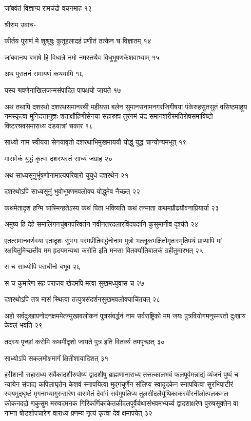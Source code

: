 जांबवंतं विज्ञाप्य रामचंद्रो वचनमाह १३

श्रीराम उवाच-

कीर्तय पुराणं मे शुश्रूषुः कुतूहलादहं प्रणीतं तत्केन च विज्ञातम् १४

जांबवानथ बभाषे हि विधात्रे नमो नमस्तथैव विधुभूषणकेशवाभ्याम् १५

अथ पुरातनं रामायणं कथयामि १६

यस्य श्रवणेनाखिलजन्मसंपादित पापक्षयो जायते १७

अथ तथापि दशरथो दशरथसमानरथी महीयसा बलेन सुमानसनामनगरजिगीषया पंकेरुहसुतसुतं
वसिष्ठमाहूय नमस्कृत्वा मुनिदत्तानुज्ञः शताक्षौहिणीसेनया सहारुह्य तुरंगमं चंद्र
समानशरीरमतिरोषसमाविष्टो विष्टरश्रवसमाराध्य दंडयात्रां चकार १८

साध्यो नाम स्वीयया सेनयावृतो दशरथाभिमुखमाययौ योद्धुं युद्धं चान्योन्यमभूत् १९

मासमेकं युद्धं कृत्वा दशरथस्तं साध्यं जग्राह २०

अथ साध्यसूनुर्भूषणोनामाल्पपरिवारो युयुधे दशरथेन २१

दशरथोऽपि साध्यसूनुं भुवोभूषणमवलोक्य योद्धुमेव नैच्छत् २२

कथमेतादृशं हन्मि चास्मिन्हतेऽस्य कथं पिता भविष्यति कथं तन्माता कथमप्रौढयौवनाप्रियार्या
 २३

अमुष्य हि देहे समालिंगनचुंबनपरिवर्तन नवीनतरदलारविंदपदानि कुसुमानीव दृश्यंते २४

एतत्समानवर्णवया एतादृशः सुभगः परमप्रीतिवर्द्धनोनाम पुत्रो भल्लूकभक्षितोमृतःस्मृतिपथं
प्राप्यापि मां रक्षयितुमिच्छतीव मम हृदयमन्यथा करोति इति मनसा वितर्क्यातिबालकं
ग्रहीतुमारभत् २५

स च साध्योपि पराधीनो बभूव २६

स च कुमारेण सह पराजय खेदमपि मत्वा सुखमध्युवास च २७

दशरथोऽपि तत्र मासं स्थित्वा तत्पुत्रसंदर्शनसुखमवलोक्याचिंतयत् २८

अहो सर्वदुःखापनोदनक्षममेतन्मुखावलोकनं पुत्रसंवर्द्धनं नाम सर्वराष्ट्रिको मम जयः
पुत्रवियोगमनुस्मरतो दुःखाय केवलं भवति २९

तदस्य पृच्छां करोमि कथमीदृशो जायते पुत्र इति वितर्क्य तमपृच्छत् ३०

साध्योऽपि सकलमोक्षमार्गं क्षितीशायादिशत् ३१

हरीशानौ सहाराध्य सर्वैकादशीरुपोष्य द्वादशीषु ब्राह्मणानाराध्य तत्तत्कालभवं
फलपूर्वमन्नाद्यं व्यंजनं पुष्पं च न्यायेन संपाद्य कपिलाघृतेन केशवं स्नापयित्वा मुद्गचूर्णेन संलिप्य
स्वादूदकेन स्नापयित्वा सुरभिपाटीरं स्वयमुद्घृष्टं मृगनाभ्यागुरुसारेण वासमेतं देवांगं सर्वमुपलिप्य
तुलसीदलैर्यूथिकाकरवीरनीलोत्पलकमल कोकनदद्रो णकुसुम मरुवदमनक
गिरिकर्णिकाकेतकीदलपूर्वैर्यथासंभवमभ्यर्च्य द्वादशाक्षरेण पुरुषसूक्तेन वा नाम्ना षोडशोपचारेण
वाराध्य प्रणम्य नृत्यं कृत्वा देवं क्षमापयेत् ३२

